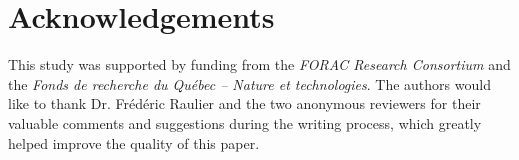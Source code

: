 \section{Acknowledgements}

This study was supported by funding from the \emph{FORAC Research
  Consortium} and the \emph{Fonds de recherche du Qu\'{e}bec -- Nature
  et technologies}. The authors would like to thank
Dr. Fr\'{e}d\'{e}ric Raulier and the two anonymous reviewers for their
valuable comments and suggestions during the writing process, which
greatly helped improve the quality of this paper.





